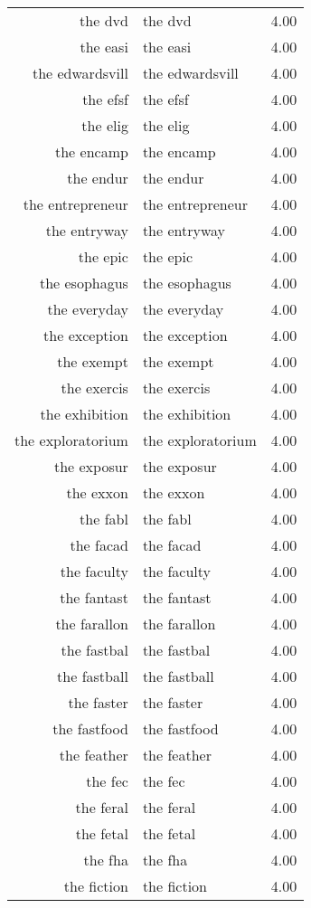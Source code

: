 \begin{table}[ht]
\begin{tabular}{rlr}
  the dvd & the dvd & 4.00 \\ 
  the easi & the easi & 4.00 \\ 
  the edwardsvill & the edwardsvill & 4.00 \\ 
  the efsf & the efsf & 4.00 \\ 
  the elig & the elig & 4.00 \\ 
  the encamp & the encamp & 4.00 \\ 
  the endur & the endur & 4.00 \\ 
  the entrepreneur & the entrepreneur & 4.00 \\ 
  the entryway & the entryway & 4.00 \\ 
  the epic & the epic & 4.00 \\ 
  the esophagus & the esophagus & 4.00 \\ 
  the everyday & the everyday & 4.00 \\ 
  the exception & the exception & 4.00 \\ 
  the exempt & the exempt & 4.00 \\ 
  the exercis & the exercis & 4.00 \\ 
  the exhibition & the exhibition & 4.00 \\ 
  the exploratorium & the exploratorium & 4.00 \\ 
  the exposur & the exposur & 4.00 \\ 
  the exxon & the exxon & 4.00 \\ 
  the fabl & the fabl & 4.00 \\ 
  the facad & the facad & 4.00 \\ 
  the faculty & the faculty & 4.00 \\ 
  the fantast & the fantast & 4.00 \\ 
  the farallon & the farallon & 4.00 \\ 
  the fastbal & the fastbal & 4.00 \\ 
  the fastball & the fastball & 4.00 \\ 
  the faster & the faster & 4.00 \\ 
  the fastfood & the fastfood & 4.00 \\ 
  the feather & the feather & 4.00 \\ 
  the fec & the fec & 4.00 \\ 
  the feral & the feral & 4.00 \\ 
  the fetal & the fetal & 4.00 \\ 
  the fha & the fha & 4.00 \\ 
  the fiction & the fiction & 4.00 \\ 

\end{tabular}
\end{table}
